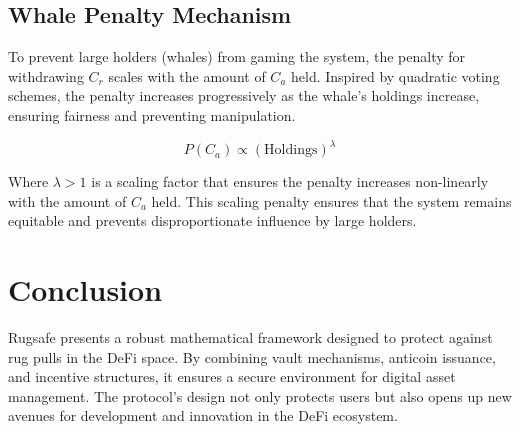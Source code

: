 \documentclass{article}
\begin{document}
\subsection{Whale Penalty Mechanism}
To prevent large holders (whales) from gaming the system, the penalty for withdrawing $C_r$ scales with the amount of $C_a$ held. Inspired by quadratic voting schemes, the penalty increases progressively as the whale's holdings increase, ensuring fairness and preventing manipulation.

\begin{equation}
P(C_a) \propto \left(\text{Holdings}\right)^\lambda
\end{equation}

Where $\lambda > 1$ is a scaling factor that ensures the penalty increases non-linearly with the amount of $C_a$ held. This scaling penalty ensures that the system remains equitable and prevents disproportionate influence by large holders.

\section{Conclusion}
Rugsafe presents a robust mathematical framework designed to protect against rug pulls in the DeFi space. By combining vault mechanisms, anticoin issuance, and incentive structures, it ensures a secure environment for digital asset management. The protocol's design not only protects users but also opens up new avenues for development and innovation in the DeFi ecosystem.
\end{document}
